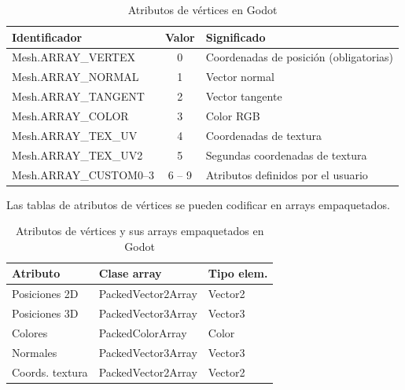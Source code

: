 \documentclass[12pt]{report} %
\begin{document}
\begin{table}[H]
\centering
\begin{tabular}{|l|c|l|}
\hline
\textbf{Identificador}         & \textbf{Valor} & \textbf{Significado}                                   \\ \hline
Mesh.ARRAY\_VERTEX             & 0              & Coordenadas de posición (obligatorias)                \\ \hline
Mesh.ARRAY\_NORMAL             & 1              & Vector normal                                         \\ \hline
Mesh.ARRAY\_TANGENT            & 2              & Vector tangente                                       \\ \hline
Mesh.ARRAY\_COLOR              & 3              & Color RGB                                            \\ \hline
Mesh.ARRAY\_TEX\_UV            & 4              & Coordenadas de textura                               \\ \hline
Mesh.ARRAY\_TEX\_UV2           & 5              & Segundas coordenadas de textura                     \\ \hline
Mesh.ARRAY\_CUSTOM0--3         & 6 -- 9         & Atributos definidos por el usuario                  \\ \hline
\end{tabular}
\caption{Atributos de vértices en Godot}
\end{table}

Las tablas de atributos de vértices se pueden codificar en arrays
empaquetados.

\begin{table}[H]
\centering
\begin{tabular}{|l|l|l|}
\hline
\textbf{Atributo}         & \textbf{Clase array}         & \textbf{Tipo elem.} \\ \hline
Posiciones 2D             & PackedVector2Array          & Vector2             \\ \hline
Posiciones 3D             & PackedVector3Array          & Vector3             \\ \hline
Colores                   & PackedColorArray            & Color               \\ \hline
Normales                  & PackedVector3Array          & Vector3             \\ \hline
Coords. textura           & PackedVector2Array          & Vector2             \\ \hline
\end{tabular}
\caption{Atributos de vértices y sus arrays empaquetados en Godot}
\end{table}
\end{document}
